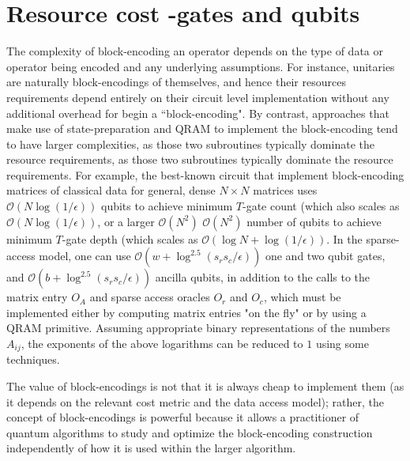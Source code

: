 \documentclass[12pt, oneside]{book}
\theoremstyle{definition}
\theoremstyle{definition}
\theoremstyle{remark}
\begin{document}
\section{Resource cost -gates and qubits}
The complexity of block-encoding an operator depends on the type of data or operator being encoded and any underlying assumptions. For instance, unitaries are naturally block-encodings
of themselves, and hence their resources requirements depend entirely on their circuit level implementation without any additional overhead for begin a ``block-encoding". By contrast, approaches that make use of state-preparation and QRAM to implement the block-encoding tend to have larger complexities, as those two subroutines typically dominate the resource requirements, as those two subroutines typically dominate the resource requirements. For example, the best-known circuit that implement block-encoding matrices of classical data for general, dense $N\times N$ matrices uses $\mathcal{O}(N\log (1/\epsilon))$ qubits to achieve minimum $T$-gate count (which also scales as $\mathcal{O}(N\log(1/\epsilon))$, or a larger $\mathcal{O}(N^2)$ $\mathcal{O}(N^2)$ number of qubits to achieve minimum $T$-gate depth (which scales as $\mathcal{O}(\log N +\log (1/\epsilon))$. In the sparse-access model, one can use $\mathcal{O}(w+\log^{2.5}(s_rs_c/\epsilon))$ one and two qubit gates, and $\mathcal{O}(b+\log^{2.5}(s_rs_c/\epsilon))$ ancilla qubits, in addition to the calls to the matrix entry $O_A$ and sparse access oracles $O_r$ and $O_c$, which must be implemented either by computing matrix entries "on the fly" or by using a QRAM primitive. Assuming appropriate binary representations of the numbers $A_{ij}$, the exponents of the above logarithms can be reduced to $1$ using some techniques.

The value of block-encodings is not that it is always cheap to implement them (as it depends on the relevant cost metric and the data access model); rather, the concept of block-encodings is powerful because it allows a practitioner of quantum algorithms to study and optimize the block-encoding construction independently of how it is used within the larger algorithm.
\end{document}
